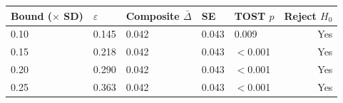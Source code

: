 \begin{tabular}[t]{lllllr}
\toprule
Bound ($\times$ SD) & $\varepsilon$ & Composite $\bar{\Delta}$ & SE & TOST $p$ & Reject $H_0$\\
\midrule
0.10 & 0.145 & 0.042 & 0.043 & 0.009 & Yes\\
0.15 & 0.218 & 0.042 & 0.043 & $<$0.001 & Yes\\
0.20 & 0.290 & 0.042 & 0.043 & $<$0.001 & Yes\\
0.25 & 0.363 & 0.042 & 0.043 & $<$0.001 & Yes\\
\bottomrule
\end{tabular}
